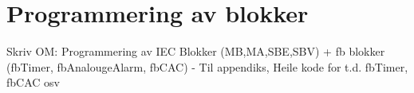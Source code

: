 \section{Programmering av blokker}
\thispagestyle{fancy}

Skriv OM:
Programmering av IEC Blokker (MB,MA,SBE,SBV) 
+ fb blokker (fbTimer, fbAnalougeAlarm, fbCAC)
- Til appendiks, Heile kode for t.d. fbTimer, fbCAC osv